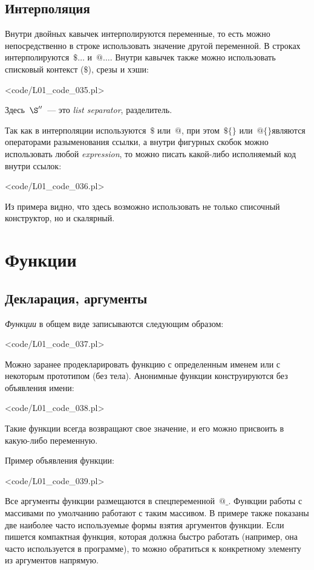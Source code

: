 \subsection{Интерполяция}
Внутри двойных кавычек интерполируются переменные, то есть можно непосредственно в строке использовать значение другой переменной.
В строках интерполируются~$\$\dots$ и~$@\dots$.
Внутри кавычек также можно использовать списковый контекст ($\$$), срезы и хэши:

\pr<code/L01_code_035.pl>

Здесь~$\S''$~--- это \textit{list separator}, разделитель.

Так как в интерполяции используются~$\$$ или~$@$, при этом~$\$\{\}$ или~$@\{\}$являются операторами разыменования ссылки, а внутри фигурных скобок можно использовать любой \textit{expression}, то можно писать какой-либо исполняемый код внутри ссылок:

\pr<code/L01_code_036.pl>

Из примера видно, что здесь возможно использовать не только списочный конструктор, но и скалярный.

\renewcommand{\lasttiming}{2625}
\section{Функции} %

\subsection{Декларация, аргументы}
\textit{Функции} в общем виде записываются следующим образом:

\pr<code/L01_code_037.pl>

Можно заранее продекларировать функцию с определенным именем или с некоторым прототипом (без тела).
Анонимные функции конструируются без объявления имени:

\pr<code/L01_code_038.pl>

Такие функции всегда возвращают свое значение, и его можно присвоить в какую-либо переменную.

Пример объявления функции:

\pr<code/L01_code_039.pl>

Все аргументы функции размещаются в спецпеременной~$@\_$.
Функции работы с массивами по умолчанию работают с таким массивом.
В примере также показаны две наиболее часто используемые формы взятия аргументов функции.
Если пишется компактная функция, которая должна быстро работать (например, она часто используется в программе), то можно обратиться к конкретному элементу из аргументов напрямую.

